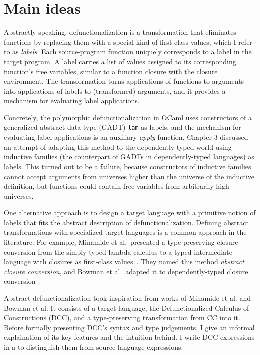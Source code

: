 
\section{Main ideas}

Abstractly speaking, defunctionalization is a transformation that eliminates functions by replacing them with a special kind of first-class values, which I refer to as \textit{labels}. Each source-program function uniquely corresponds to a label in the target program. 
A label carries a list of values assigned to its corresponding function's free variables, similar to a function closure with the closure environment. 
The transformation turns applications of functions to arguments into applications of labels to (transformed) arguments, and it provides a mechanism for evaluating label applications.

Concretely, the polymorphic defunctionalization in OCaml uses constructors of a generalized abstract data type (GADT) \texttt{lam} as labels, and the mechanism for evaluating label applications is an auxiliary \textit{apply} function. Chapter 3 discussed an attempt of adapting this method to the dependently-typed world using inductive families (the counterpart of GADTs in dependently-typed languages) as labels. 
This turned out to be a failure, because constructors of inductive families cannot accept arguments from universes higher than the universe of the inductive definition, but functions could contain free variables from arbitrarily high universes.

One alternative approach is to design a target language with a primitive notion of labels that fits the abstract description of defunctionalization. Defining abstract transformations with specialized target languages is a common approach in the literature. For example, Minamide et al.~presented a type-preserving closure conversion from the simply-typed lambda calculus to a typed intermediate language with closures as first-class values~\cite{DBLP:conf/popl/MinamideMH96}. They named this method \textit{abstract closure conversion}, and Bowman et al.~adapted it to dependently-typed closure conversion~\cite{DBLP:conf/pldi/BowmanA18}. 

Abstract defunctionalization took inspiration from works of Minamide et al. and Bowman et al. It consists of a target language, the Defunctionalized Calculus of Constructions (DCC), and a type-preserving transformation from CC into it. 
Before formally presenting DCC's syntax and type judgements, I give an informal explaination of its key features and the intuition behind. I write DCC expressions in a  \color{black} to distinguish them from source language expressions.

